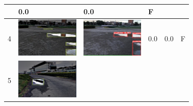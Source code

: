 \documentclass[10pt]{jarticle}
\begin{document}
\begin{table}[H]
\begin{tabular}{|l|l|l|l|l|l|}
\begin{minipage}{.1\textwidth}
           \end{minipage}       & 0.0 & 0.0 & F      \\ \hline
        4  & \begin{minipage}{.1\textwidth}
            \centering
            \includegraphics[width=0.9\linewidth]{./fig/tab4_a.png}
           \end{minipage}       & \begin{minipage}{.1\textwidth}
            \centering
            \includegraphics[width=0.9\linewidth]{./fig/tab4_r.png}
           \end{minipage}       & 0.0 & 0.0 & F      \\ \hline
        5  & \begin{minipage}{.1\textwidth}
            \centering
            \includegraphics[width=0.9\linewidth]{./fig/tab5_a.png}

\end{minipage}
\end{tabular}
\end{table}
\end{document}
